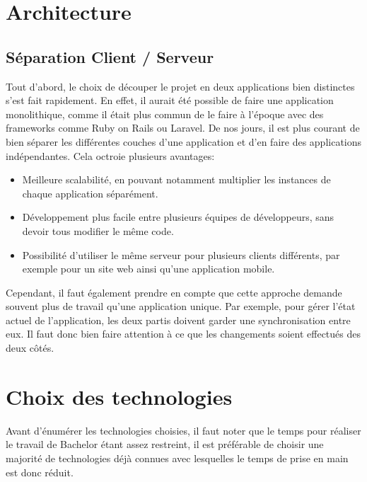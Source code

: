 \section{Architecture}


\subsection{Séparation Client / Serveur}

Tout d'abord, le choix de découper le projet en deux applications bien distinctes s'est fait rapidement. En effet, il aurait été possible de faire une application monolithique, comme il était plus commun de le faire à l'époque avec des frameworks comme Ruby on Rails ou Laravel. De nos jours, il est plus courant de bien séparer les différentes couches d'une application et d'en faire des applications indépendantes. Cela octroie plusieurs avantages:

\begin{itemize}
  \item Meilleure scalabilité, en pouvant notamment multiplier les instances de chaque application séparément.
  \item Développement plus facile entre plusieurs équipes de développeurs, sans devoir tous modifier le même code.
  \item Possibilité d'utiliser le même serveur pour plusieurs clients différents, par exemple pour un site web ainsi qu'une application mobile.
\end{itemize}

Cependant, il faut également prendre en compte que cette approche demande souvent plus de travail qu'une application unique. Par exemple, pour gérer l'état actuel de l'application, les deux partis doivent garder une synchronisation entre eux. Il faut donc bien faire attention à ce que les changements soient effectués des deux côtés.

\section{Choix des technologies}

Avant d'énumérer les technologies choisies, il faut noter que le temps pour réaliser le travail de Bachelor étant assez restreint, il est préférable de choisir une majorité de technologies déjà connues avec lesquelles le temps de prise en main est donc réduit.


